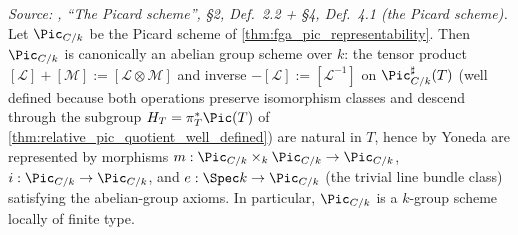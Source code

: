 \begin{theorem}\leanok
  \label{thm:pic_is_group_scheme}

  \textit{Source: \cite{kleiman-picard}, ``The Picard scheme'', \S 2, Def.~2.2 +
  \S 4, Def.~4.1 (the Picard scheme).}
  Let \(\Pic_{C/k}\) be the Picard scheme of
  \cref{thm:fga_pic_representability}. Then \(\Pic_{C/k}\) is canonically an
  abelian group scheme over \(k\): the tensor product
  \([\mathcal{L}] + [\mathcal{M}] := [\mathcal{L} \otimes \mathcal{M}]\)
  and inverse \(-[\mathcal{L}] := [\mathcal{L}^{-1}]\) on
  \(\Pic^\sharp_{C/k}(T)\) (well defined because both operations
  preserve isomorphism classes and descend through the subgroup
  \(H_T = \pi_T^*\Pic(T)\) of \cref{thm:relative_pic_quotient_well_defined})
  are natural in \(T\), hence by Yoneda are represented by morphisms
  \(m : \Pic_{C/k} \times_k \Pic_{C/k} \to \Pic_{C/k}\),
  \(i : \Pic_{C/k} \to \Pic_{C/k}\), and
  \(e : \Spec k \to \Pic_{C/k}\) (the trivial line bundle class) satisfying
  the abelian-group axioms. In particular, \(\Pic_{C/k}\) is a \(k\)-group
  scheme locally of finite type.
\end{theorem}

